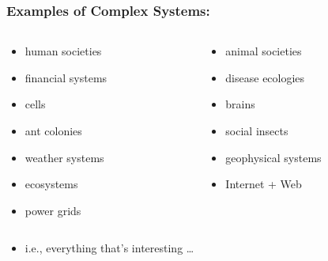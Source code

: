 \begin{frame}
  \frametitle{Examples of Complex Systems:}

  \begin{block}{}
    \begin{columns}[t] 
      \begin{column}{0.45\textwidth} 
        \begin{itemize}
        \item
          human societies 
        \item
          financial systems
        \item
          cells     
        \item
          ant colonies 
        \item
          weather systems 
        \item
          ecosystems     
        \item
          power grids
        \end{itemize}
      \end{column} 
      \begin{column}{0.45\textwidth} 
        \begin{itemize}
        \item
          animal societies     
        \item
          disease ecologies    
        \item
          brains               
        \item
          social insects       
        \item
          geophysical systems  
        \item
          Internet + Web
        \end{itemize}
      \end{column} 
    \end{columns} 
  \end{block}

  \begin{itemize}
  \item<+->
    i.e., everything that's interesting \ldots
  \end{itemize}


\end{frame}

